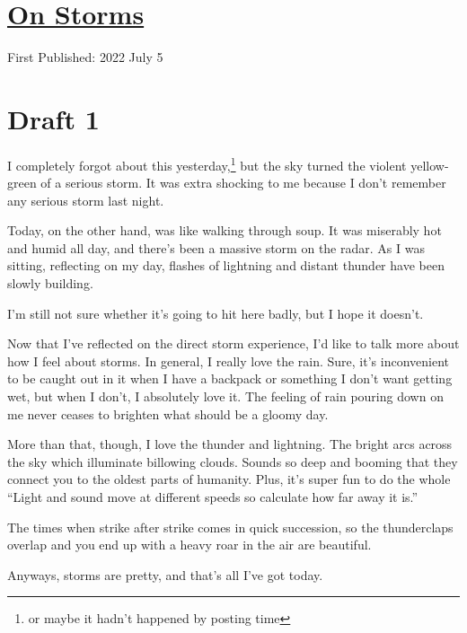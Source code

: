 \documentclass[12pt]{article}[titlepage]
\newcommand{\say}[1]{``#1''}
\newcommand{\1}{\={a}}
\newcommand{\2}{\={e}}
\newcommand{\3}{\={\i}}
\newcommand{\4}{\=o}
\newcommand{\5}{\=u}
\newcommand{\6}{\={A}}
\renewcommand{\,}{\textsuperscript{,}}
\begin{document}
\doublespacing
\section{\href{storms.html}{On Storms}}
First Published: 2022 July 5
\section{Draft 1}
I completely forgot about this yesterday,\footnote{or maybe it hadn't happened by posting time} but the sky turned the violent yellow-green of a serious storm.
It was extra shocking to me because I don't remember any serious storm last night.

Today, on the other hand, was like walking through soup.
It was miserably hot and humid all day, and there's been a massive storm on the radar.
As I was sitting, reflecting on my day, flashes of lightning and distant thunder have been slowly building.

I'm still not sure whether it's going to hit here badly, but I hope it doesn't.

Now that I've reflected on the direct storm experience, I'd like to talk more about how I feel about storms.
In general, I really love the rain.
Sure, it's inconvenient to be caught out in it when I have a backpack or something I don't want getting wet, but when I don't, I absolutely love it.
The feeling of rain pouring down on me never ceases to brighten what should be a gloomy day.

More than that, though, I love the thunder and lightning.
The bright arcs across the sky which illuminate billowing clouds.
Sounds so deep and booming that they connect you to the oldest parts of humanity.
Plus, it's super fun to do the whole \say{Light and sound move at different speeds so calculate how far away it is.}

The times when strike after strike comes in quick succession, so the thunderclaps overlap and you end up with a heavy roar in the air are beautiful.

Anyways, storms are pretty, and that's all I've got today.
\end{document}
